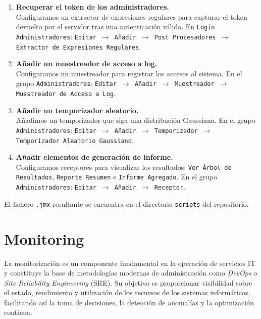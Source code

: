 \begin{enumerate}
\begin{enumerate}
            \item \textbf{Recuperar el token de los administradores.} \\
            Configuramos un extractor de expresiones regulares para capturar el token devuelto por el servidor tras una autenticación válida. En \texttt{Login Administradores}: \texttt{Editar $\rightarrow$ Añadir $\rightarrow$ Post Procesadores $\rightarrow$ Extractor de Expresiones Regulares}.

            \item \textbf{Añadir un muestreador de acceso a log.} \\
            Configuramos un muestreador para registrar los accesos al sistema. En el grupo \texttt{Administradores}: \texttt{Editar $\rightarrow$ Añadir $\rightarrow$ Muestreador $\rightarrow$ Muestreador de Acceso a Log}.

            \item \textbf{Añadir un temporizador aleatorio.} \\
            Añadimos un temporizador que siga una distribución Gaussiana. En el grupo \texttt{Administradores}: \texttt{Editar $\rightarrow$ Añadir $\rightarrow$ Temporizador $\rightarrow$ Temporizador Aleatorio Gaussiano}.

            \item \textbf{Añadir elementos de generación de informe.} \\
            Configuramos receptores para visualizar los resultados: \texttt{Ver Árbol de Resultados}, \texttt{Reporte Resumen} e \texttt{Informe Agregado}. En el grupo \texttt{Administradores}: \texttt{Editar $\rightarrow$ Añadir $\rightarrow$ Receptor}.
    \end{enumerate}

    El fichero \texttt{.jmx} resultante se encuentra en el directorio \texttt{scripts} del repositorio.

\end{enumerate}

\section{Monitoring}

La monitorización es un componente fundamental en la operación de servicios IT y constituye la base de metodologías modernas de administración como \textit{DevOps} o \textit{Site Reliability Engineering} (SRE). Su objetivo es proporcionar visibilidad sobre el estado, rendimiento y utilización de los recursos de los sistemas informáticos, facilitando así la toma de decisiones, la detección de anomalías y la optimización continua.

